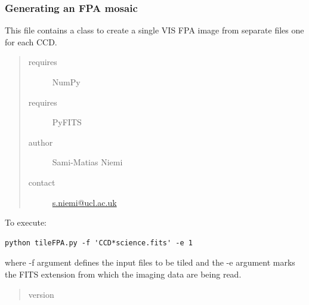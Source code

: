 \documentclass[a4paper,11pt,english]{sphinxmanual}
\begin{document}
\subsubsection{Generating an FPA mosaic}
\label{postproc:generating-an-fpa-mosaic}
This file contains a class to create a single VIS FPA image from separate files one for each CCD.
\begin{quote}\begin{description}
\item[{requires}] \leavevmode
NumPy

\item[{requires}] \leavevmode
PyFITS

\item[{author}] \leavevmode
Sami-Matias Niemi

\item[{contact}] \leavevmode
\href{mailto:s.niemi@ucl.ac.uk}{s.niemi@ucl.ac.uk}

\end{description}\end{quote}

To execute:

\begin{Verbatim}[commandchars=\\\{\}]
python tileFPA.py -f 'CCD*science.fits' -e 1
\end{Verbatim}

where -f argument defines the input files to be tiled and the -e argument marks the
FITS extension from which the imaging data are being read.
\begin{quote}\begin{description}
\item[{version}] 

\end{description}\end{quote}
\end{document}
